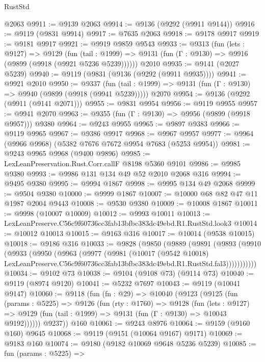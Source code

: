 \begin{lexlean}{RustStd}
\begin{coremodule}
    @2063
@9911 := @9139 @2063
@9914 := @9136 (@9292 (@9911 @9144))
@9916 := @9119 (@9831 @9914)
@9917 := @7635 @2063
@9918 := @9178 @9917
@9919 := @9181 @9917
@9921 := @9919 @9859 @9543
@9933 := @9313
    (fun (lets : @9127) =>
    @9129
      (fun (tail : @1999) => @9131 (fun (Γ : @9130) => @9916 (@9899 (@9918 (@9921 @5236 @5239))))))
    @2010
@9935 := @9141 (@2027 @5239)
@9940 := @9119 (@9831 (@9136 (@9292 (@9911 @9935))))
@9941 := @9921 @2010
@9950 := @9337
    (fun (tail : @1999) => @9131 (fun (Γ : @9130) => @9940 (@9899 (@9918 (@9941 @5239)))))
    @2070
@9954 := @9136 (@9292 (@9911 (@9141 @2071)))
@9955 := @9831 @9954
@9956 := @9119 @9955
@9957 := @9941 @2070
@9963 := @9355 (fun (Γ : @9130) => @9956 (@9899 (@9918 @9957))) @9380
@9964 := @9243 @9955
@9965 := @9897 @9383
@9966 := @9119 @9965
@9967 := @9386 @9917
@9968 := @9967 @9957
@9977 := @9964 (@9966 @9968) (@5382 @7676 @7672 @9954 @7683 (@5253 @9954))
@9981 := @9243 @9965 @9968 (@9400 @9896)
@9985 := LexLeanPreservation.Rust.Corr.callF @8198 @5360 @9101
@9986 := @9985 @9380
@9993 := @9986 @131 @134 @49 @52 @2010 @2068 @316
@9994 := @9495 @9380
@9995 := @9994 @1867
@9998 := @9995 @134 @49 @2068
@9999 := @9504 @9380
@10000 := @9999 @1867
@10007 := @10000 @68 @82 @47 @11 @1987 @2004 @9443
@10008 := @9530 @9380
@10009 := @10008 @1867
@10011 := @9998 (@10007 @10009)
@10012 := @9993 @10011
@10013 := LexLeanPreserve.C56c9f60736cc3fab13bfbc383dc49ebd.R1.RustStd.look3
@10014 := @10012 @10013
@10015 := @9163 @316
@10017 := @10014 (@9538 @10015)
@10018 := @9186 @316
@10033 := @9828
    (@9850
      (@9889
        (@9891
          (@9893
            (@9910
              (@9933
                (@9950
                  (@9963
                    (@9977
                      (@9981
                        (@10017
                          (@9542 @10018)
                          LexLeanPreserve.C56c9f60736cc3fab13bfbc383dc49ebd.R1.RustStd.fal3)))))))))))
@10034 := @9102 @73
@10038 := @9104 (@9108 @73) (@9114 @73)
@10040 := @9119 (@8974 @9120)
@10041 := @5232 @7697
@10043 := @9119 (@10041 @9147)
@10060 := @9118
    (fun (fn : @29) =>
    @10040
      (@9123
        (@9125
          (fun (params : @5225) =>
          @9126
            (fun (rty : @1760) =>
            @9128
              (fun (lets : @9127) =>
              @9129 (fun (tail : @1999) => @9131 (fun (Γ : @9130) => @10043 @9192))))))
        @9237))
    @160
@10061 := @9243 @8976
@10064 := @9159 (@9160 @160) @9645
@10068 := @9119 (@9151 (@10064 @9167) @9171)
@10069 := @9183 @160
@10074 := @9180 (@9182 @10069 @9648 @5236 @5239)
@10085 := fun (params : @5225) =>

\end{coremodule}
\end{lexlean}
